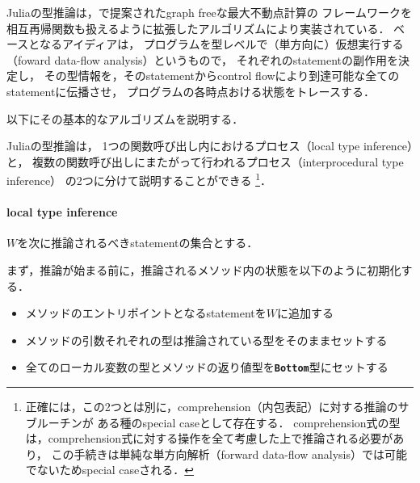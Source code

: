 Juliaの型推論は，\cite{graph-free-data-flow-analysis}で提案されたgraph freeな最大不動点計算の
フレームワークを相互再帰関数も扱えるように拡張したアルゴリズムにより実装されている．
ベースとなるアイディアは，
プログラムを型レベルで（単方向に）仮想実行する（foward data-flow analysis）というもので，
それぞれのstatementの副作用を決定し，
その型情報を，そのstatementからcontrol flowにより到達可能な全てのstatementに伝播させ，
プログラムの各時点おける状態をトレースする．

以下にその基本的なアルゴリズムを説明する\cite{jameson, julia-2012}．

Juliaの型推論は，
1つの関数呼び出し内におけるプロセス（local type inference）と，
複数の関数呼び出しにまたがって行われるプロセス（interprocedural type inference）
の2つに分けて説明することができる
\footnote{
  正確には，この2つとは別に，comprehension（内包表記）に対する推論のサブルーチンが
  ある種のspecial caseとして存在する\cite{jameson}．
  comprehension式の型は，comprehension式に対する操作を全て考慮した上で推論される必要があり，
  この手続きは単純な単方向解析（forward data-flow analysis）では可能でないためspecial caseされる．
}．

\paragraph{local type inference}

\(W\)を次に推論されるべきstatementの集合とする． %

まず，推論が始まる前に，推論されるメソッド内の状態を以下のように初期化する．

\begin{itemize}
  \item メソッドのエントリポイントとなるstatementを\(W\)に追加する
  \item メソッドの引数それぞれの型は推論されている型をそのままセットする
  \item 全てのローカル変数の型とメソッドの返り値型を\textbf{\texttt{Bottom}}型\footnotemark にセットする
\end{itemize}


